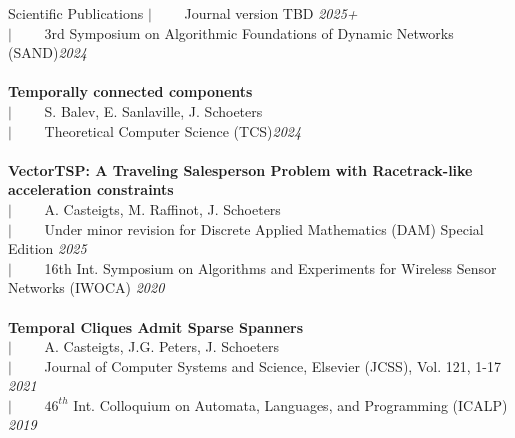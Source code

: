 \documentclass[french]{resume} %
\begin{document}
\begin{rSection}{Scientific Publications }
		$| \qquad$ Journal version TBD \hfill {\em 2025+}\\
		$| \qquad$ 3rd Symposium on Algorithmic Foundations of Dynamic Networks (SAND)\hfill {\em 2024}
		\\
		\\
		{\bf Temporally connected components}\\
		$| \qquad$ S. Balev, E. Sanlaville, J. Schoeters\\
		$| \qquad$ Theoretical Computer Science (TCS)\hfill {\em 2024}
		\\
		\\
		{\bf VectorTSP: A Traveling Salesperson Problem with Racetrack-like acceleration constraints}\\
		$| \qquad$ A. Casteigts, M. Raffinot, J. Schoeters\\
		$| \qquad$ Under minor revision for Discrete Applied Mathematics (DAM) Special Edition \hfill {\em 2025}\\
		$| \qquad$ {\small 16th Int. Symposium on Algorithms and Experiments for Wireless Sensor Networks (IWOCA)} \hfill {\em 2020}
		\\
		\\
		{\bf Temporal Cliques Admit Sparse Spanners}\\
		$| \qquad$ A. Casteigts, J.G. Peters, J. Schoeters\\
		$| \qquad$ Journal of Computer Systems and Science, Elsevier (JCSS), Vol. 121, 1-17 \hfill {\em 2021}\\
		$| \qquad$ $46^{th}$ Int. Colloquium on Automata, Languages, and Programming (ICALP) \hfill {\em 2019}
	\end{rSection}
	
\end{document}

